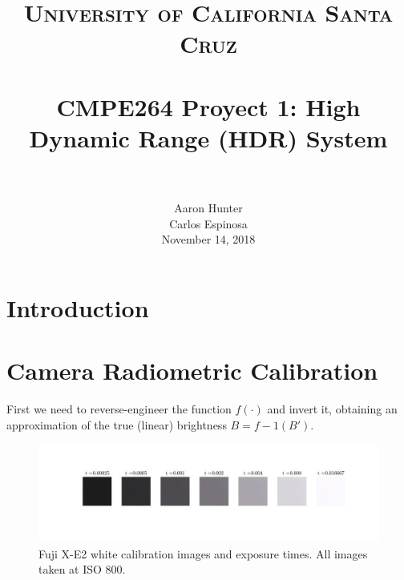 \documentclass[a4paper]{article}
\title{
		\vspace{-0.6in} 	
		\usefont{OT1}{bch}{b}{n}
		\normalfont \normalsize \textsc{University of California Santa Cruz} \\ [10pt]
		\horrule{0.5pt} \\[0.4cm]
		\huge CMPE264 Proyect 1: High Dynamic Range (HDR) System \\
		\horrule{2pt} \\[0.5cm]
}
\author{
		\normalfont 								
        Aaron Hunter\\  Carlos Espinosa\\[-3pt]		\normalsize
        November 14, 2018
}
\date{}
\begin{document}
\maketitle
\section{Introduction}

\section{Camera Radiometric Calibration}
First we need to reverse-engineer the function $f(\cdot)$ and invert it, obtaining an approximation of the true (linear) brightness $B=f-1(B')$.
\begin{figure}[htb!]
    \begin{center}
        \includegraphics[width=\textwidth]{white_fuji.jpg}
	 \end{center}
    \caption{Fuji X-E2 white calibration images and exposure times. All images taken at ISO 800.} 
    \label{fig:white}
\end{figure}
\end{document}
